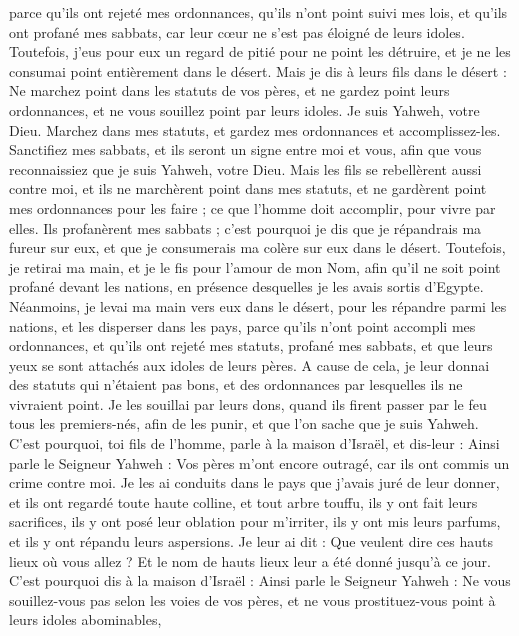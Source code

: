 \begin{multicols}{2}
parce qu'ils ont rejeté mes ordonnances, qu'ils n'ont point suivi mes lois, et qu'ils ont profané mes sabbats, car leur cœur ne s’est pas éloigné de leurs idoles.
Toutefois, j’eus pour eux un regard de pitié pour ne point les détruire, et je ne les consumai point entièrement dans le désert.
Mais je dis à leurs fils dans le désert : Ne marchez point dans les statuts de vos pères, et ne gardez point leurs ordonnances, et ne vous souillez point par leurs idoles.
Je suis Yahweh, votre Dieu. Marchez dans mes statuts, et gardez mes ordonnances et accomplissez-les.
Sanctifiez mes sabbats, et ils seront un signe entre moi et vous, afin que vous reconnaissiez que je suis Yahweh, votre Dieu.
Mais les fils se rebellèrent aussi contre moi, et ils ne marchèrent point dans mes statuts, et ne gardèrent point mes ordonnances pour les faire ; ce que l'homme doit accomplir, pour vivre par elles. Ils profanèrent mes sabbats ; c'est pourquoi je dis que je répandrais ma fureur sur eux, et que je consumerais ma colère sur eux dans le désert.
Toutefois, je retirai ma main, et je le fis pour l'amour de mon Nom, afin qu'il ne soit point profané devant les nations, en présence desquelles je les avais sortis d'Egypte.
Néanmoins, je levai ma main vers eux dans le désert, pour les répandre parmi les nations, et les disperser dans les pays\FTNT{},
parce qu'ils n'ont point accompli mes ordonnances, et qu'ils ont rejeté mes statuts, profané mes sabbats, et que leurs yeux se sont attachés aux idoles de leurs pères.
A cause de cela, je leur donnai des statuts qui n'étaient pas bons, et des ordonnances par lesquelles ils ne vivraient point.
Je les souillai par leurs dons, quand ils firent passer par le feu tous les premiers-nés, afin de les punir, et que l'on sache que je suis Yahweh.
C'est pourquoi, toi fils de l’homme, parle à la maison d'Israël, et dis-leur : Ainsi parle le Seigneur Yahweh : Vos pères m'ont encore outragé, car ils ont commis un crime contre moi.
Je les ai conduits dans le pays que j’avais juré de leur donner, et ils ont regardé toute haute colline, et tout arbre touffu, ils y ont fait leurs sacrifices, ils y ont posé leur oblation pour m'irriter, ils y ont mis leurs parfums, et ils y ont répandu leurs aspersions.
Je leur ai dit : Que veulent dire ces hauts lieux où vous allez ? Et le nom de hauts lieux leur a été donné jusqu'à ce jour.
C'est pourquoi dis à la maison d'Israël : Ainsi parle le Seigneur Yahweh : Ne vous souillez-vous pas selon les voies de vos pères, et ne vous prostituez-vous point à leurs idoles abominables,

\end{multicols}

